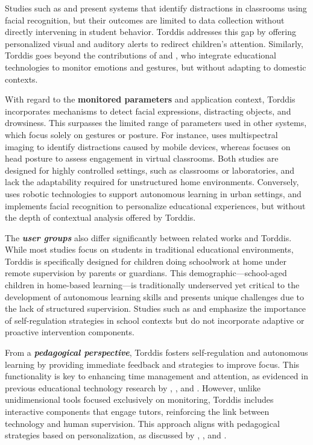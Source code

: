                 Studies such as \cite{Erazo2016Easing} and \cite{Nguyen2019} present systems that identify distractions in classrooms using facial recognition, but their outcomes are limited to data collection without directly intervening in student behavior. Torddis addresses this gap by offering personalized visual and auditory alerts to redirect children's attention. Similarly, Torddis goes beyond the contributions of \cite{Ozdamli2022} and \cite{VilliersRader2021}, who integrate educational technologies to monitor emotions and gestures, but without adapting to domestic contexts.
                
                With regard to the \textbf{monitored parameters} and application context, Torddis incorporates mechanisms to detect facial expressions, distracting objects, and drowsiness. This surpasses the limited range of parameters used in other systems, which focus solely on gestures or posture. For instance, \cite{Campbell2015Using} uses multispectral imaging to identify distractions caused by mobile devices, whereas \cite{Ucar2022Recognizing} focuses on head posture to assess engagement in virtual classrooms. Both studies are designed for highly controlled settings, such as classrooms or laboratories, and lack the adaptability required for unstructured home environments. Conversely, \cite{DaCosta2023} uses robotic technologies to support autonomous learning in urban settings, and \cite{Boumiza2017} implements facial recognition to personalize educational experiences, but without the depth of contextual analysis offered by Torddis.
                
                The \textbf{\textit{user groups}} also differ significantly between related works and Torddis. While most studies focus on students in traditional educational environments, Torddis is specifically designed for children doing schoolwork at home under remote supervision by parents or guardians. This demographic—school-aged children in home-based learning—is traditionally underserved yet critical to the development of autonomous learning skills and presents unique challenges due to the lack of structured supervision. Studies such as \cite{Roberts2020Task} and \cite{Muljana2022Instructional} emphasize the importance of self-regulation strategies in school contexts but do not incorporate adaptive or proactive intervention components.
                
                From a \textbf{\textit{pedagogical perspective}}, Torddis fosters self-regulation and autonomous learning by providing immediate feedback and strategies to improve focus. This functionality is key to enhancing time management and attention, as evidenced in previous educational technology research by \cite{Palmer2022impact}, \cite{Roberts2020Task}, and \cite{Wang2022Empowering}. However, unlike unidimensional tools focused exclusively on monitoring, Torddis includes interactive components that engage tutors, reinforcing the link between technology and human supervision. This approach aligns with pedagogical strategies based on personalization, as discussed by \cite{Salter2014Exploring}, \cite{Bembich2016Future}, and \cite{Adcroft2018Developing}.
                
